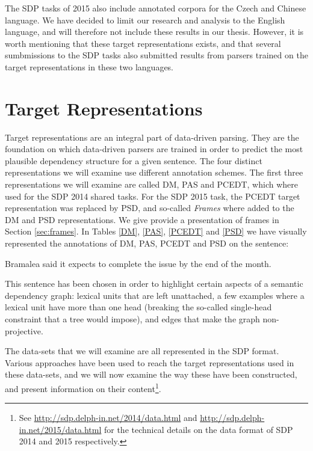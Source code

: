 The SDP tasks of 2015 also include annotated corpora for the Czech and Chinese language. We have decided to limit our research and analysis to the English language, and will therefore not include these results in our thesis. However, it is worth mentioning that these target representations exists, and that several sumbmissions to the SDP tasks also submitted results from parsers trained on the target representations in these two languages.

\section{Target Representations}
\label{sec:representations}

Target representations are an integral part of data-driven parsing. They are the foundation on which data-driven parsers are trained in order to predict the most plausible dependency structure for a given sentence. The four distinct representations we will examine use different annotation schemes. The first three representations we will examine are called DM, PAS and PCEDT, which where used for the SDP 2014 shared tasks. For the SDP 2015 task, the PCEDT target representation was replaced by PSD, and so-called \textit{Frames} where added to the DM and PSD representations. We give provide a presentation of frames in Section \ref{sec:frames}. In Tables \ref{DM}, \ref{PAS}, \ref{PCEDT} and \ref{PSD} we have visually represented the annotations of DM, PAS, PCEDT and PSD on the sentence:

\begin{displayquote}
Bramalea said it expects to complete the issue by the end of the month.
\end{displayquote}

This sentence has been chosen in order to highlight certain aspects of a semantic dependency graph: lexical units that are left unattached, a few examples where a lexical unit have more than one head (breaking the so-called single-head constraint that a tree would impose), and edges that make the graph non-projective. 

The data-sets that we will examine are all represented in the SDP format. Various approaches have been used to reach the target representations used in these data-sets, and we will now examine the way these have been constructed, and present information on their content\footnote{See \url{http://sdp.delph-in.net/2014/data.html} and \url{http://sdp.delph-in.net/2015/data.html} for the technical details on the data format of SDP 2014 and 2015 respectively.}.


